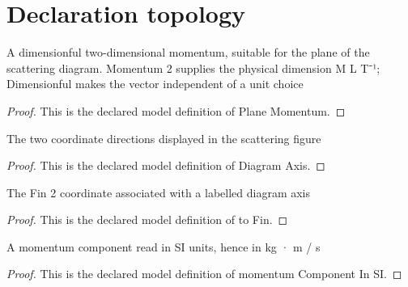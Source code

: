 \section{Declaration topology}
\begin{definition}
  \label{def:physics:phyx-mini-0531:phyxminiproblems-problemphyxmini0531-planemomentum}
  A dimensionful two-dimensional momentum, suitable for the plane of the scattering diagram. Momentum 2 supplies the physical dimension M L T⁻¹; Dimensionful makes the vector independent of a unit choice
\end{definition}
\begin{proof}
  This is the declared model definition of Plane Momentum.
\end{proof}
\begin{definition}
  \label{def:physics:phyx-mini-0531:phyxminiproblems-problemphyxmini0531-diagramaxis}
  The two coordinate directions displayed in the scattering figure
\end{definition}
\begin{proof}
  This is the declared model definition of Diagram Axis.
\end{proof}
\begin{definition}[to Fin]
  \label{def:physics:phyx-mini-0531:phyxminiproblems-problemphyxmini0531-diagramaxis-tofin}
  The Fin 2 coordinate associated with a labelled diagram axis
\end{definition}
\begin{proof}
  This is the declared model definition of to Fin.
\end{proof}
\begin{definition}
  \label{def:physics:phyx-mini-0531:phyxminiproblems-problemphyxmini0531-momentumcomponentinsi}
  A momentum component read in SI units, hence in kg · m / s
\end{definition}
\begin{proof}
  This is the declared model definition of momentum Component In SI.
\end{proof}
